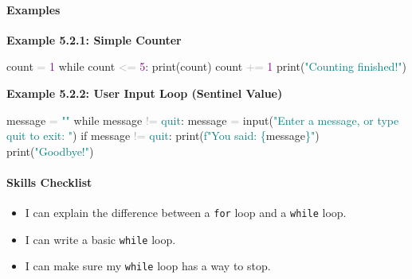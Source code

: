 \documentclass[
  justified,
  openright,
]{tufte-book}
\let\subsubsection\paragraph
\let\paragraph\paragraph
\newcommand{\BuiltInTok}[1]{#1}
\newcommand{\ControlFlowTok}[1]{\textcolor{BrandBlue}{#1}}
\newcommand{\DecValTok}[1]{\textcolor{Purple}{#1}}
\newcommand{\NormalTok}[1]{#1}
\newcommand{\OperatorTok}[1]{\textcolor{DarkGray}{#1}}
\newcommand{\SpecialCharTok}[1]{\textcolor{Teal}{#1}}
\newcommand{\SpecialStringTok}[1]{\textcolor{Teal}{#1}}
\newcommand{\StringTok}[1]{\textcolor{Teal}{#1}}
\newenvironment{Shaded}{%
  \begin{snugshade}
}{%
  \end{snugshade}
}
\let\subsubsection\paragraph
\let\paragraph\paragraph
\providecommand{\tightlist}{%
  \setlength{\itemsep}{0pt}\setlength{\parskip}{0pt}}
\begin{document}
\subsubsection{Examples}\label{examples-11}

\textbf{Example 5.2.1: Simple Counter}

\begin{Shaded}
\begin{Highlighting}[]
\NormalTok{count }\OperatorTok{=} \DecValTok{1}
\ControlFlowTok{while}\NormalTok{ count }\OperatorTok{\textless{}=} \DecValTok{5}\NormalTok{:}
    \BuiltInTok{print}\NormalTok{(count)}
\NormalTok{    count }\OperatorTok{+=} \DecValTok{1}
\BuiltInTok{print}\NormalTok{(}\StringTok{"Counting finished!"}\NormalTok{)}
\end{Highlighting}
\end{Shaded}

\textbf{Example 5.2.2: User Input Loop (Sentinel Value)}

\begin{Shaded}
\begin{Highlighting}[]
\NormalTok{message }\OperatorTok{=} \StringTok{""}
\ControlFlowTok{while}\NormalTok{ message }\OperatorTok{!=} \StringTok{\textquotesingle{}quit\textquotesingle{}}\NormalTok{:}
\NormalTok{    message }\OperatorTok{=} \BuiltInTok{input}\NormalTok{(}\StringTok{"Enter a message, or type \textquotesingle{}quit\textquotesingle{} to exit: "}\NormalTok{)}
    \ControlFlowTok{if}\NormalTok{ message }\OperatorTok{!=} \StringTok{\textquotesingle{}quit\textquotesingle{}}\NormalTok{:}
        \BuiltInTok{print}\NormalTok{(}\SpecialStringTok{f"You said: }\SpecialCharTok{\{}\NormalTok{message}\SpecialCharTok{\}}\SpecialStringTok{"}\NormalTok{)}
\BuiltInTok{print}\NormalTok{(}\StringTok{"Goodbye!"}\NormalTok{)}
\end{Highlighting}
\end{Shaded}

\subsubsection{Skills Checklist}\label{skills-checklist-23}

\begin{itemize}
\tightlist
\item[$\square$]
  I can explain the difference between a \texttt{for} loop and a
  \texttt{while} loop.
\item[$\square$]
  I can write a basic \texttt{while} loop.
\item[$\square$]
  I can make sure my \texttt{while} loop has a way to stop.
\end{itemize}
\end{document}
